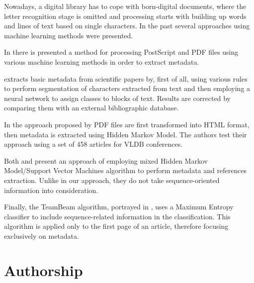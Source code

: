 Nowadays, a digital library has to cope with born-digital documents, where the letter recognition stage is omitted and processing starts with building up words and lines of text based on single characters. In the past several approaches using machine learning methods were presented.

In \cite{Esposito2008} there is presented a method for processing PostScript and PDF files using various machine learning methods in order to extract metadata.

\cite{Marinai2009} extracts basic metadata from scientific papers by, first of all, using various rules to perform segmentation of characters extracted from text and then employing a neural network to assign classes to blocks of text. Results are corrected by comparing them with an external bibliographic database.

In the approach proposed by \cite{Chen.2010} PDF files are first transformed into HTML format, then metadata is extracted using Hidden Markov Model. The authors test their approach using a set of 458 articles for VLDB conferences.

Both \cite{HuiHan} and \cite{HuiHan2005} present an approach of employing mixed Hidden Markov Model/Support Vector Machines algorithm to perform metadata and references extraction. Unlike in our approach, they do not take sequence-oriented information into consideration.

Finally, the TeamBeam algorithm, portrayed in \cite{Kern2012}, uses a Maximum Entropy classifier to include sequence-related information in the classification. This algorithm is applied only to the first page of an article, therefore focusing exclusively on metadata.

\section{Authorship}


